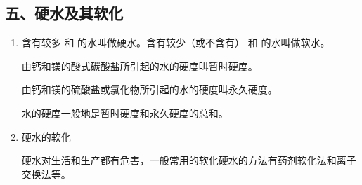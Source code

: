 \subsection*{五、硬水及其软化}
\begin{enumerate}[1.]
  \item 含有较多  和  的水叫做硬水。含有较少（或不含有） 和  的水叫做软水。
  
  由钙和镁的酸式碳酸盐所引起的水的硬度叫暂时硬度。

  由钙和镁的硫酸盐或氯化物所引起的水的硬度叫永久硬度。

  水的硬度一般地是暂时硬度和永久硬度的总和。
  \item 硬水的软化
  
  硬水对生活和生产都有危害，一般常用的软化硬水的方法有药剂软化法和离子交换法等。
\end{enumerate}

